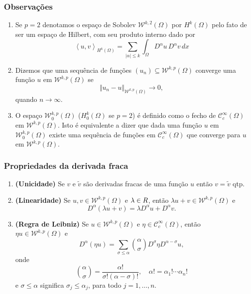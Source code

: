 \documentclass[xcolor=dvipsnames, aspectratio=169, 10pt]{beamer}
\let\mathbb\relax
\newcommand{\bR}{\mathbb{R}}
\newcommand{\cC}{\mathcal{C}}
\newcommand{\cW}{\mathcal{W}}
\begin{document}
\begin{frame}
    \frametitle{Observações}
    \begin{enumerate}[label=\arabic*.]
        \item Se $p = 2$ denotamos o espaço de Sobolev $\cW^{k,2}(\Omega)$ por $H^k(\Omega)$ pelo fato de ser um espaço de Hilbert, com seu produto interno dado por
        \[
            \left\langle u, v \right\rangle _{H^k(\Omega)} = \sum_{|\alpha| \leqslant k} \int_{\Omega} D^\alpha u \, D^\alpha v \,dx
        \] \pause
        \item Dizemos que uma sequência de funções $(u_n) \subseteq \cW^{k,p}(\Omega)$ converge uma função $u$ em $\cW^{k,p}(\Omega)$ se
        \[
            \Vert u_n - u \Vert_{\cW^{k,p}(\Omega)} \to 0,
        \]
        quando $n \to \infty$. \pause
        \item O espaço $\cW^{k,p}_0(\Omega)$ ($H^k_0(\Omega)$ se $p =2$) é definido como o fecho de $\cC^{\infty}_c(\Omega)$ em $\cW^{k,p}(\Omega)$. Isto é equivalente a dizer que dada uma função $u$ em $\cW^{k,p}_0(\Omega)$ existe uma sequência de funções em $\cC^{\infty}_c(\Omega)$ que converge para $u$ em $\cW^{k,p}(\Omega)$.
    \end{enumerate}
\end{frame}
\begin{frame}
    \frametitle{Propriedades da derivada fraca}
    \begin{enumerate}[label=\arabic*.]
        \item \textbf{(Unicidade)} Se $v$ e $\tilde v$ são derivadas fracas de uma função $u$ então $v = \tilde v$ qtp. \pause
        \item \textbf{(Linearidade)} Se $u, v \in \cW^{k,p}(\Omega)$ e $\lambda \in \bR$, então $\lambda u + v \in \cW^{k,p}(\Omega)$ e
        \[
            D^\alpha(\lambda u + v) = \lambda D^\alpha u + D^\alpha v.
        \] \pause
        \item \textbf{(Regra de Leibniz)} Se $u \in \cW^{k,p}(\Omega)$ e $\eta \in \cC^{\infty}_c(\Omega)$, então $\eta u \in \cW^{k,p}(\Omega)$ e
        \begin{equation} \label{eq:regra-de-leibniz}
            D^\alpha (\eta u) = \sum_{\sigma \leqslant \alpha} \binom{\alpha}{\sigma} D^{\sigma} \eta D^{\alpha - \sigma} u,
        \end{equation}
        onde
        \[
            \binom{\alpha}{\sigma} = \frac{\alpha!}{\sigma!(\alpha - \sigma)!}, \quad \alpha! = \alpha_1!\cdots \alpha_n!
        \]
        e $\sigma \leqslant \alpha$ significa $\sigma_j \leqslant \alpha_j$, para todo $j = 1,\dots,n$.
    \end{enumerate}
\end{frame}
\end{document}
